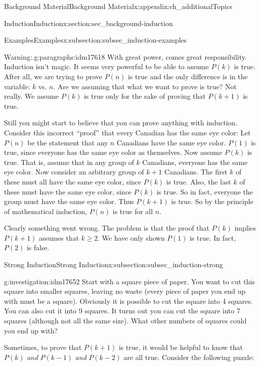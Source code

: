 \documentclass[oneside,10pt,]{book}
\numberwithin{equation}{chapter}
\begin{document}
\begin{appendixptx}{Background Material}{}{Background Material}{}{}{x:appendix:ch_additionalTopics}
\begin{sectionptx}{Induction}{}{Induction}{}{}{x:section:sec_background-induction}
\begin{subsectionptx}{Examples}{}{Examples}{}{}{x:subsection:subsec_induction-examples}
\begin{paragraphs}{Warning:.}{g:paragraphs:idm17618}
With great power, comes great responsibility. Induction isn't magic. It seems very powerful to be able to assume \(P(k)\) is true. After all, we are trying to prove \(P(n)\) is true and the only difference is in the variable: \(k\) vs. \(n\). Are we assuming that what we want to prove is true? Not really. We assume \(P(k)\) is true only for the sake of proving that \(P(k+1)\) is true.%
\par
Still you might start to believe that you can prove anything with induction. Consider this incorrect ``proof'' that every Canadian has the same eye color: Let \(P(n)\) be the statement that any \(n\) Canadians have the same eye color. \(P(1)\) is true, since everyone has the same eye color as themselves. Now assume \(P(k)\) is true. That is, assume that in any group of \(k\) Canadians, everyone has the same eye color. Now consider an arbitrary group of \(k+1\) Canadians. The first \(k\) of these must all have the same eye color, since \(P(k)\) is true. Also, the last \(k\) of these must have the same eye color, since \(P(k)\) is true. So in fact, everyone the group must have the same eye color. Thus \(P(k+1)\) is true. So by the principle of mathematical induction, \(P(n)\) is true for all \(n\).%
\par
Clearly something went wrong. The problem is that the proof that \(P(k)\) implies \(P(k+1)\) assumes that \(k \ge 2\). We have only shown \(P(1)\) is true. In fact, \(P(2)\) is false.%
\end{paragraphs}%
\end{subsectionptx}
%
%
\typeout{************************************************}
\typeout{************************************************}
%
\begin{subsectionptx}{Strong Induction}{}{Strong Induction}{}{}{x:subsection:subsec_induction-strong}
\begin{investigation}{}{g:investigation:idm17652}%
Start with a square piece of paper. You want to cut this square into smaller squares, leaving no waste (every piece of paper you end up with must be a square). Obviously it is possible to cut the square into 4 squares. You can also cut it into 9 squares. It turns out you can cut the square into 7 squares (although not all the same size). What other numbers of squares could you end up with?%
\end{investigation}
Sometimes, to prove that \(P(k+1)\) is true, it would be helpful to know that \(P(k)\) \emph{and} \(P(k-1)\) \emph{and} \(P(k-2)\) are all true. Consider the following puzzle:%

\end{subsectionptx}
\end{sectionptx}
\end{appendixptx}
\end{document}
